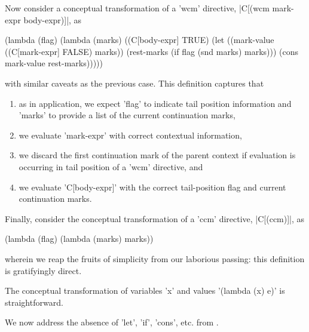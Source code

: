 Now consider a conceptual transformation of a \scheme'wcm' directive, \scheme|C[(wcm mark-expr body-expr)]|, as
\begin{schemeblock}
\begin{schemedisplay}
(lambda (flag)
  (lambda (marks)
    ((C[body-expr] TRUE) (let ((mark-value ((C[mark-expr] FALSE) marks))
                               (rest-marks (if flag (snd marks) marks)))
                           (cons mark-value rest-marks)))))
\end{schemedisplay}
\end{schemeblock}
with similar caveats as the previous case. This definition captures that
\begin{enumerate}
\item as in application, we expect \scheme'flag' to indicate tail position information and \scheme'marks' to provide a list of the current continuation marks,
\item we evaluate \scheme'mark-expr' with correct contextual information,
\item we discard the first continuation mark of the parent context if evaluation is occurring in tail position of a \scheme'wcm' directive, and
\item we evaluate \scheme'C[body-expr]' with the correct tail-position flag and current continuation marks.
\end{enumerate}

Finally, consider the conceptual transformation of a \scheme'ccm' directive, \scheme|C[(ccm)]|, as
\begin{schemeblock}
\begin{schemedisplay}
(lambda (flag)
  (lambda (marks)
    marks))
\end{schemedisplay}
\end{schemeblock}
wherein we reap the fruits of simplicity from our laborious passing: this definition is gratifyingly direct.

The conceptual transformation of variables \scheme'x' and values \scheme'(lambda (x) e)' is straightforward.

We now address the absence of \scheme'let', \scheme'if', \scheme'cons', etc. from \lv.

